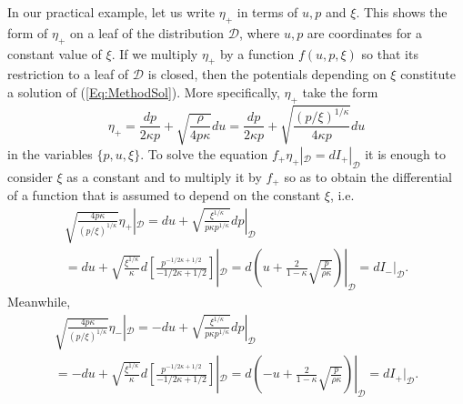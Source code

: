 \documentclass[12pt]{article}
\theoremstyle{plain}
\theoremstyle{definition}
\numberwithin{equation}{section}
\begin{document}
In our practical example, let us write $\eta_+$ in terms of $u,p$ and $\xi$. This shows the form of $\eta_+$ on a leaf of the distribution $\mathcal{D}$, where $u,p$ are coordinates for a constant value of $\xi$. If we multiply $\eta_+$ by a function $f(u,p,\xi)$ so that its  restriction to a leaf of $\mathcal{D}$ is closed, then the potentials depending on $\xi$  constitute a solution of (\ref{Eq:MethodSol}). More specifically, $\eta_+$ take the form 
$$\eta_+=\frac{dp}{2\kappa p} +\sqrt{\frac{\rho}{4p\kappa}}du=\frac{dp}{2\kappa p} +\sqrt{\frac{(p/\xi)^{1/\kappa}}{4 \kappa p}}du
$$
 in the variables $\{p,u,\xi\}$. To solve the equation $f_+\eta_+|_{\mathcal{D}}=dI_+|_{\mathcal{D}}$ it is enough to consider $\xi$ as a constant and to multiply it by $f_+$ so as to obtain the differential of a function that is assumed to depend on the constant $\xi$, i.e.
\begin{multline*}
\sqrt{\frac{4 p\kappa}{(p/\xi)^{1/\kappa}}}\eta_+|_{\mathcal{D}}=du+\sqrt{\frac{\xi^{1/\kappa}}{p\kappa p^{1/\kappa}}}dp|_{\mathcal{D}}\\=du+\sqrt{\frac{\xi^{1/\kappa}}{\kappa}}d\left[\frac{p^{-1/2\kappa+1/2}}{-1/2\kappa+1/2}\right]|_{\mathcal{D}}=d\left(u+\frac{2}{1-\kappa}\sqrt{\frac{p}{\rho\kappa}}\right)|_{\mathcal{D}}=dI_-|_{\mathcal{D}}.    
\end{multline*}
Meanwhile,
\begin{multline*}
\sqrt{\frac{4 p\kappa}{(p/\xi)^{1/\kappa}}}\eta_-|_{\mathcal{D}}=-du+\sqrt{\frac{\xi^{1/\kappa}}{p\kappa p^{1/\kappa}}}dp|_{\mathcal{D}}\\=-du+\sqrt{\frac{\xi^{1/\kappa}}{\kappa}}d\left[\frac{p^{-1/2\kappa+1/2}}{-1/2\kappa+1/2}\right]|_{\mathcal{D}}=d\left(-u+\frac{2}{1-\kappa}\sqrt{\frac{p}{\rho\kappa}}\right)|_{\mathcal{D}}=dI_+|_{\mathcal{D}}.    
\end{multline*}


 
\end{document}
